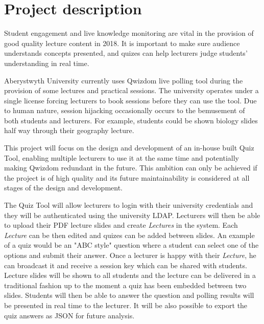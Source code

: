 \documentclass[11pt,fleqn,twoside]{article}
\begin{document}
\wordcount{}

\mmp

\setcounter{tocdepth}{3} %

\section{Project description}
Student engagement and live knowledge monitoring are vital in the provision of good quality
lecture content in 2018. It is important to make sure audience understands concepts presented,
and quizes can help lecturers judge students' understanding in real time.

Aberystwyth University currently uses Qwizdom live polling tool during the provision
of some lectures and practical sessions. The university operates under a single license
forcing lecturers to book sessions before they can use the tool. Due to human nature,
session hijacking occasionally occurs to the bemusement of both students and lecturers.
For example, students could be shown biology slides half way through their geography
lecture.

This project will focus on the design and development of an in-house built Quiz Tool,
enabling multiple lecturers to use it at the same time and potentially making Qwizdom
redundant in the future. This ambition can only be achieved if the project is of
high quality and its future maintainability is considered at all stages of the design
and development.

The Quiz Tool will allow lecturers to login with their university credentials and
they will be authenticated using the university LDAP. Lecturers will then
be able to upload their PDF lecture slides and create \textit{Lectures} in the system.
Each \textit{Lecture} can be then edited and quizes can be added between slides.
An example of a quiz would be an "ABC style" question where a student can select
one of the options and submit their answer. Once a lecturer is happy with their
\textit{Lecture}, he can broadcast it and receive a session key which can be
shared with students. Lecture slides will be shown to all students and the
lecture can be delivered in a traditional fashion up to the moment a quiz
has been embedded between two slides. Students will then be able to answer
the question and polling results will be presented in real time to the lecturer.
It will be also possible to export the quiz answers as JSON for future analysis.
\end{document}
